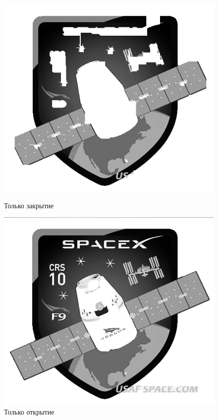 \newpage


\begin{figure}[!htb]
    \includegraphics[width=\linewidth]{../img/outputs/morph_filters/spacex_only_close.png}
    \caption{Только закрытие}
    \endminipage\hfill
    \includegraphics[width=\linewidth]{../img/outputs/morph_filters/spacex_only_open.png}
    \caption{Только открытие}
    \endminipage\hfill
\end{figure}

